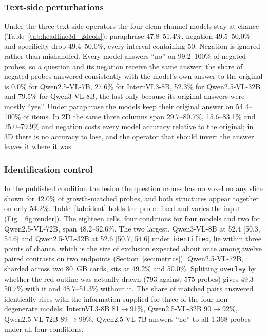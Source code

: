 \subsubsection{Text-side perturbations} Under the three text-side operators
the four clean-channel models stay at chance
(Table~\ref{tab:headline3d_2dcols}): paraphrase 47.8--51.4\%, negation
49.5--50.0\% and specificity drop 49.4--50.0\%, every interval containing 50.
Negation is ignored rather than mishandled. Every model answers ``no'' on
99.2--100\% of negated probes, so a question and its negation receive the
same answer; the share of negated probes answered consistently with the
model's own answer to the original is 0.0\% for Qwen2.5-VL-7B, 27.6\% for
InternVL3-8B, 52.3\% for Qwen2.5-VL-32B and 79.5\% for Qwen3-VL-8B, the last
only because its original answers were mostly ``yes''. Under paraphrase the
models keep their original answer on 54.4--100\% of items. In 2D the same
three columns span 29.7--80.7\%, 15.6--83.1\% and 25.0--79.9\% and negation
costs every model accuracy relative to the original; in 3D there is no
accuracy to lose, and the operator that should invert the answer leaves it
where it was.

\subsubsection{Identification control} In the published condition the
lesion the question names has no voxel on any slice shown for 42.0\% of
growth-matched probes, and both structures appear together on only 54.2\%.
Table~\ref{tab:ident} holds the probe fixed and varies the input
(Fig.~\ref{fig:render}). The
eighteen cells, four conditions for four models and two for Qwen2.5-VL-72B,
span 48.2--52.6\%. The two
largest, Qwen3-VL-8B at 52.4 [50.3, 54.6] and Qwen2.5-VL-32B at 52.6
[50.7, 54.6] under \texttt{identified}, lie within three points of chance,
which is the size of exclusion expected about once among twelve paired
contrasts on two endpoints (Section~\ref{sec:metrics}). Qwen2.5-VL-72B, sharded across two 80~GB cards, sits at
49.2\% and 50.0\%. Splitting \texttt{overlay} by whether the red outline was
actually drawn (793 against 575 probes) gives 49.3--50.7\% with it and
48.7--51.3\% without it. The share of matched pairs answered identically rises with
the information supplied for three of the four non-degenerate models:
InternVL3-8B 81$\rightarrow$91\%, Qwen2.5-VL-32B 90$\rightarrow$92\%,
Qwen2.5-VL-72B 89$\rightarrow$99\%. Qwen2.5-VL-7B answers ``no'' to all
1{,}368 probes under all four conditions.

